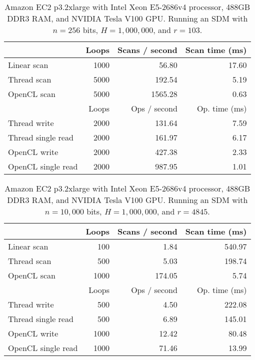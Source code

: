 \begin{table}[!htb]
\centering
\begin{tabular}{| l | r | r | r |}
    \hline
    & Loops & Scans / second & Scan time (ms) \\ \hline
    Linear scan & 1000 & 56.80 & 17.60 \\
    Thread scan & 5000 & 192.54 & 5.19 \\
    OpenCL scan & 5000 & 1565.28 & 0.63 \\ \hline
    \hline
    & Loops & Ops / second & Op. time (ms) \\ \hline
    Thread write & 2000 & 131.64 & 7.59 \\
    Thread single read & 2000 & 161.97 & 6.17 \\
    OpenCL write & 2000 & 427.38 & 2.33 \\
    OpenCL single read & 2000 & 987.95 & 1.01 \\
    \hline
\end{tabular}
\caption{Amazon EC2 p3.2xlarge with Intel Xeon E5-2686v4 processor, 488GB DDR3 RAM, and NVIDIA Tesla V100 GPU. Running an SDM with $n=256$ bits, $H=1,000,000$, and $r=103$.}
\end{table}

\begin{table}[!htb]
\centering
\begin{tabular}{| l | r | r | r |}
    \hline
    & Loops & Scans / second & Scan time (ms) \\ \hline
    Linear scan & 100 & 1.84 & 540.97 \\
    Thread scan & 500 & 5.03 & 198.74 \\
    OpenCL scan & 1000 & 174.05 & 5.74 \\ \hline
    \hline
    & Loops & Ops / second & Op. time (ms) \\ \hline
    Thread write & 500 & 4.50 & 222.08 \\
    Thread single read & 500 & 6.89 & 145.01 \\
    OpenCL write & 1000 & 12.42 & 80.48 \\
    OpenCL single read & 1000 & 71.46 & 13.99 \\
    \hline
\end{tabular}
\caption{Amazon EC2 p3.2xlarge with Intel Xeon E5-2686v4 processor, 488GB DDR3 RAM, and NVIDIA Tesla V100 GPU. Running an SDM with $n=10,000$ bits, $H=1,000,000$, and $r=4845$.}
\end{table}


